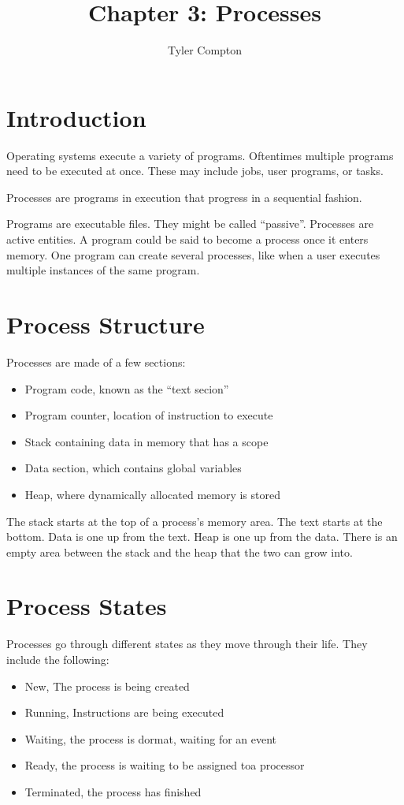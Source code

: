 \documentclass{article}
\author{Tyler Compton}
\title{Chapter 3: Processes}
\begin{document}
\maketitle
\tableofcontents

\section{Introduction}
Operating systems execute a variety of programs. Oftentimes multiple programs
need to be executed at once. These may include jobs, user programs, or tasks.

Processes are programs in execution that progress in a sequential fashion.

Programs are executable files. They might be called ``passive''. Processes are
active entities. A program could be said to become a process once it enters
memory. One program can create several processes, like when a user executes
multiple instances of the same program.

\section{Process Structure}
Processes are made of a few sections:

\begin{itemize}
	\item Program code, known as the ``text secion''
	\item Program counter, location of instruction to execute
	\item Stack containing data in memory that has a scope
	\item Data section, which contains global variables
	\item Heap, where dynamically allocated memory is stored
\end{itemize}

The stack starts at the top of a process's memory area. The text starts at the
bottom. Data is one up from the text. Heap is one up from the data. There is an
empty area between the stack and the heap that the two can grow into.

\section{Process States}
Processes go through different states as they move through their life. They
include the following:

\begin{itemize}
	\item New, The process is being created
	\item Running, Instructions are being executed
	\item Waiting, the process is dormat, waiting for an event
	\item Ready, the process is waiting to be assigned toa processor
	\item Terminated, the process has finished
\end{itemize}
\end{document}
